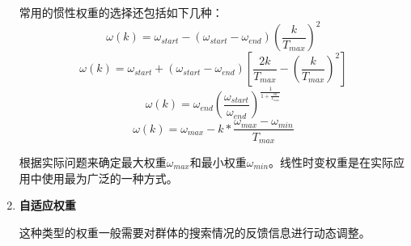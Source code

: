 \begin{enumerate}
	\hspace{2em}常用的惯性权重的选择还包括如下几种：$$\omega(k)=\omega_{start}-(\omega_{start}-\omega_{end})(\frac{k}{T_{max}})^2$$
	$$\omega(k)=\omega_{start}+(\omega_{start}-\omega_{end})[\frac{2k}{T_{max}}-(\frac{k}{T_{max}})^2]$$
	$$\omega(k)=\omega_{end}(\frac{\omega_{start}}{\omega_{end}})^{\frac{1}{1+\frac{ck}{T_{max}}}}$$
	$$\omega(k)=\omega_{max}-k*\frac{\omega_{max}-\omega_{min}}{T_{max}}$$
	
	\hspace{2em}根据实际问题来确定最大权重$\omega_{max}$和最小权重$\omega_{min}$。线性时变权重是在实际应用中使用最为广泛的一种方式。
	\item \textbf{自适应权重}
	
	\hspace{2em}这种类型的权重一般需要对群体的搜索情况的反馈信息进行动态调整。
	
\end{enumerate}

